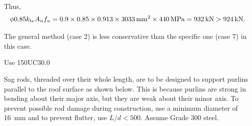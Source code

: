 \begin{solution}
Thus,
\begin{gather*}
\phi0.85k_{te}A_nf_u=0.9\times0.85\times0.913\times\SI{3033}{\milli\meter^2}\times\SI{440}{\mega\pascal}=\SI{932}{\kilo\newton}>\SI{924}{\kilo\newton}.
\end{gather*}

The general method (case 2) is less conservative than the specific one (case 7) in this case.
\begin{flushright}
Use 150UC30.0
\end{flushright}
\begin{figure}[H]
\centering

\end{figure}
\end{solution}

\begin{exmp}
Sag rods, threaded over their whole length, are to be designed to support purlins parallel to the roof surface as shown below. This is because purlins are strong in bending about their major axis, but they are weak about their minor axis. To prevent possible rod damage during construction, use a minimum diameter of \SI{16}{\mm} and to prevent flutter, use $L/d<500$. Assume Grade 300 steel.
\begin{figure}[H]
\centering

\end{figure}
\end{exmp}
